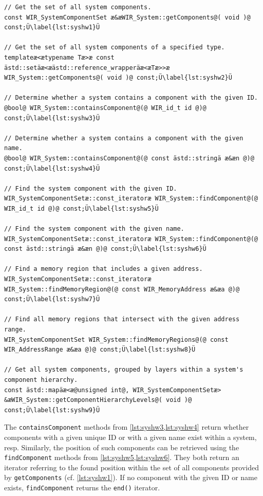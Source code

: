 \begin{lstlisting}[style=code,float=t,caption={System Component Handling of Class \texttt{WIR\_System}},label=lst:syshw]
// Get the set of all system components.
const WIR_SystemComponentSet æ&æWIR_System::getComponents@( void )@ const;Ü\label{lst:syshw1}Ü

// Get the set of all system components of a specified type.
templateæ<ætypename Tæ>æ const ästd::setäæ<æästd::reference_wrapperäæ<æTæ>>æ WIR_System::getComponents@( void )@ const;Ü\label{lst:syshw2}Ü

// Determine whether a system contains a component with the given ID.
@bool@ WIR_System::containsComponent@(@ WIR_id_t id @)@ const;Ü\label{lst:syshw3}Ü

// Determine whether a system contains a component with the given name.
@bool@ WIR_System::containsComponent@(@ const ästd::stringä æ&æn @)@ const;Ü\label{lst:syshw4}Ü

// Find the system component with the given ID.
WIR_SystemComponentSetæ::const_iteratoræ WIR_System::findComponent@(@ WIR_id_t id @)@ const;Ü\label{lst:syshw5}Ü

// Find the system component with the given name.
WIR_SystemComponentSetæ::const_iteratoræ WIR_System::findComponent@(@ const ästd::stringä æ&æn @)@ const;Ü\label{lst:syshw6}Ü

// Find a memory region that includes a given address.
WIR_SystemComponentSetæ::const_iteratoræ WIR_System::findMemoryRegion@(@ const WIR_MemoryAddress æ&æa @)@ const;Ü\label{lst:syshw7}Ü

// Find all memory regions that intersect with the given address range.
WIR_SystemComponentSet WIR_System::findMemoryRegions@(@ const WIR_AddressRange æ&æa @)@ const;Ü\label{lst:syshw8}Ü

// Get all system components, grouped by layers within a system's component hierarchy.
const ästd::mapäæ<æ@unsigned int@, WIR_SystemComponentSetæ> &æWIR_System::getComponentHierarchyLevels@( void )@ const;Ü\label{lst:syshw9}Ü
\end{lstlisting}

The \texttt{containsComponent} methods from \cref{lst:syshw3,lst:syshw4} return whether components with a given unique ID or with a given name exist within a system, resp.
Similarly, the position of such components can be retrieved using the \texttt{findComponent} methods from \cref{lst:syshw5,lst:syshw6}.
They both return an iterator referring to the found position within the set of all components provided by \texttt{getComponents} (cf. \cref{lst:syshw1}).
If no component with the given ID or name exists, \texttt{findComponent} returns the \texttt{end()} iterator.


